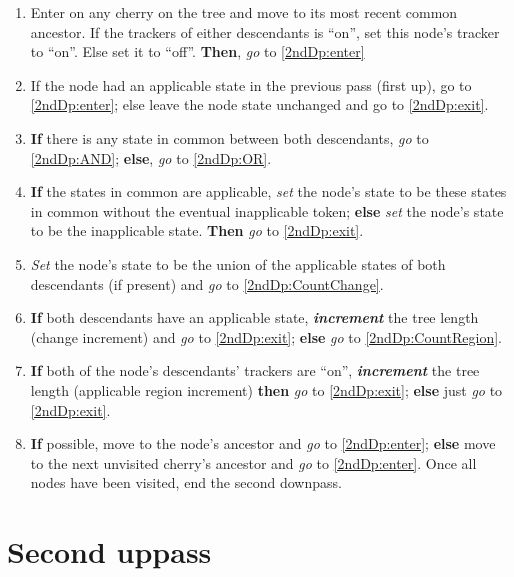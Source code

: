 \documentclass[a4paper,12pt]{article}
\begin{document}
\begin{enumerate}

    \item \label{2ndDp:entry} Enter on any cherry on the tree and move to its most recent common ancestor. If the trackers of either descendants is ``on'', set this node's tracker to ``on''. Else set it to ``off''. \textbf{Then}, \textit{go} to \ref{2ndDp:enter}
    \item \label{2ndDp:nodeAppli} If the node had an applicable state in the previous pass (first up), go to \ref{2ndDp:enter}; else leave the node state unchanged and go to \ref{2ndDp:exit}.
    \item \label{2ndDp:enter} \textbf{If} there is any state in common between both descendants, \textit{go} to \ref{2ndDp:AND}; \textbf{else}, \textit{go} to \ref{2ndDp:OR}.
    \item \label{2ndDp:AND} \textbf{If} the states in common are applicable, \textit{set} the node's state to be these states in common without the eventual inapplicable token; \textbf{else} \textit{set} the node's state to be the inapplicable state. \textbf{Then} \textit{go} to \ref{2ndDp:exit}. 
    \item \label{2ndDp:OR} \textit{Set} the node's state to be the union of the applicable states of both descendants (if present) and \textit{go} to \ref{2ndDp:CountChange}.
    \item \label{2ndDp:CountChange} \textbf{If} both descendants have an applicable state, \textbf{\textit{increment}} the tree length (change increment) and \textit{go} to \ref{2ndDp:exit}; \textbf{else} \textit{go} to \ref{2ndDp:CountRegion}.
    \item \label{2ndDp:CountRegion} \textbf{If} both of the node's descendants' trackers are ``on'', \textbf{\textit{increment}} the tree length (applicable region increment) \textbf{then} \textit{go} to \ref{2ndDp:exit}; \textbf{else} just \textit{go} to \ref{2ndDp:exit}.
    \item \label{2ndDp:exit} \textbf{If} possible, move to the node's ancestor and \textit{go} to \ref{2ndDp:enter}; \textbf{else} move to the next unvisited cherry's ancestor and \textit{go} to \ref{2ndDp:enter}. Once all nodes have been visited, end the second downpass.
\end{enumerate}

\section{Second uppass} \label{2ndUp}
\end{document}

